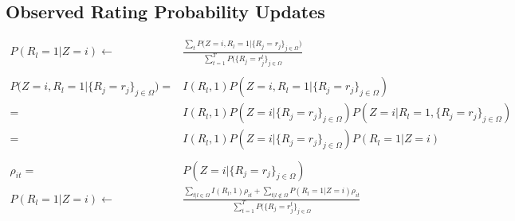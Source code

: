 \documentclass{article}
\begin{document}
\subsection{Observed Rating Probability Updates}
\begin{align*}
	P(R_l=1|Z=i) \leftarrow& \frac{\sum_t P(Z=i, R_l=1 |  {\{R_j=r_j\}_{j\in \Omega })}}{ \sum_{t=1}^{T}P(\{R_j=r_j^t\}_{j\in \Omega}}\\\\
	P(Z=i, R_l=1 |  {\{R_j=r_j\}_{j\in \Omega })}=& I(R_l, 1)P(Z=i, R_l=1 | {\{R_j=r_j\}_{j\in \Omega }}) \\
	=& I(R_l, 1)P(Z=i | {\{R_j=r_j\}_{j\in \Omega }})P(Z=i | R_l=1, {\{R_j=r_j\}_{j\in \Omega }})\\
	=&  I(R_l, 1)P(Z=i | {\{R_j=r_j\}_{j\in \Omega }})P(R_l=1|Z=i) \\\\
	\rho_{it} =& P(Z=i | {\{R_j=r_j\}_{j\in \Omega }})\\
	P(R_l=1|Z=i) \leftarrow& \frac{\sum_{t|l \in \Omega} I(R_l, 1)\rho_{it}  + \sum_{t|l \notin \Omega} P(R_l=1 |Z=i)\rho_{it}     }{ \sum_{t=1}^{T}P(\{R_j=r_j^t\}_{j\in \Omega}}\\\\
\end{align*}
\end{document}
